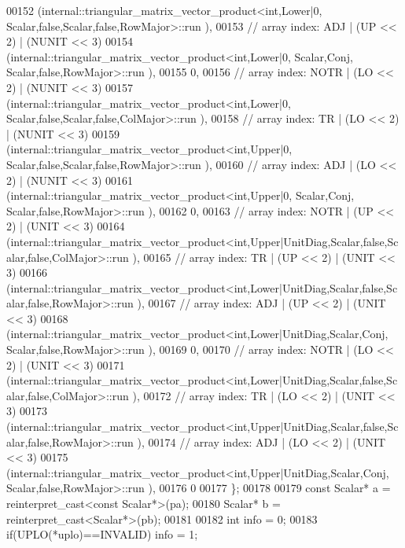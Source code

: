 \begin{DoxyCode}
00152     (internal::triangular\_matrix\_vector\_product<int,Lower|0,       Scalar,false,Scalar,false,RowMajor>::run
      ),
00153     \textcolor{comment}{// array index: ADJ   | (UP << 2) | (NUNIT << 3)}
00154     (internal::triangular\_matrix\_vector\_product<int,Lower|0,       Scalar,Conj, Scalar,false,RowMajor>::run
      ),
00155     0,
00156     \textcolor{comment}{// array index: NOTR  | (LO << 2) | (NUNIT << 3)}
00157     (internal::triangular\_matrix\_vector\_product<int,Lower|0,       Scalar,false,Scalar,false,ColMajor>::run
      ),
00158     \textcolor{comment}{// array index: TR    | (LO << 2) | (NUNIT << 3)}
00159     (internal::triangular\_matrix\_vector\_product<int,Upper|0,       Scalar,false,Scalar,false,RowMajor>::run
      ),
00160     \textcolor{comment}{// array index: ADJ   | (LO << 2) | (NUNIT << 3)}
00161     (internal::triangular\_matrix\_vector\_product<int,Upper|0,       Scalar,Conj, Scalar,false,RowMajor>::run
      ),
00162     0,
00163     \textcolor{comment}{// array index: NOTR  | (UP << 2) | (UNIT  << 3)}
00164     (internal::triangular\_matrix\_vector\_product<int,Upper|UnitDiag,Scalar,false,Scalar,false,ColMajor>::run
      ),
00165     \textcolor{comment}{// array index: TR    | (UP << 2) | (UNIT  << 3)}
00166     (internal::triangular\_matrix\_vector\_product<int,Lower|UnitDiag,Scalar,false,Scalar,false,RowMajor>::run
      ),
00167     \textcolor{comment}{// array index: ADJ   | (UP << 2) | (UNIT  << 3)}
00168     (internal::triangular\_matrix\_vector\_product<int,Lower|UnitDiag,Scalar,Conj, Scalar,false,RowMajor>::run
      ),
00169     0,
00170     \textcolor{comment}{// array index: NOTR  | (LO << 2) | (UNIT  << 3)}
00171     (internal::triangular\_matrix\_vector\_product<int,Lower|UnitDiag,Scalar,false,Scalar,false,ColMajor>::run
      ),
00172     \textcolor{comment}{// array index: TR    | (LO << 2) | (UNIT  << 3)}
00173     (internal::triangular\_matrix\_vector\_product<int,Upper|UnitDiag,Scalar,false,Scalar,false,RowMajor>::run
      ),
00174     \textcolor{comment}{// array index: ADJ   | (LO << 2) | (UNIT  << 3)}
00175     (internal::triangular\_matrix\_vector\_product<int,Upper|UnitDiag,Scalar,Conj, Scalar,false,RowMajor>::run
      ),
00176     0
00177   \};
00178 
00179   \textcolor{keyword}{const} Scalar* a = \textcolor{keyword}{reinterpret\_cast<}\textcolor{keyword}{const }Scalar*\textcolor{keyword}{>}(pa);
00180   Scalar* b = \textcolor{keyword}{reinterpret\_cast<}Scalar*\textcolor{keyword}{>}(pb);
00181 
00182   \textcolor{keywordtype}{int} info = 0;
00183   \textcolor{keywordflow}{if}(UPLO(*uplo)==INVALID)                                            info = 1;

\end{DoxyCode}
